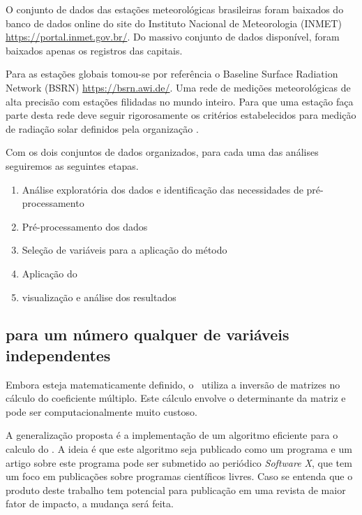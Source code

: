 
O conjunto de dados das estações meteorológicas brasileiras foram baixados do banco de dados online do site do Instituto Nacional de Meteorologia (INMET) \url{https://portal.inmet.gov.br/}. Do massivo conjunto de dados disponível, foram baixados apenas os registros das capitais.

Para as estações globais tomou-se por referência o Baseline Surface Radiation Network (BSRN) \url{https://bsrn.awi.de/}. Uma rede de medições meteorológicas de alta precisão com estações filidadas no mundo inteiro. Para que uma estação faça parte desta rede deve seguir rigorosamente os critérios estabelecidos para medição de radiação solar definidos pela organização \cite{Salazar2020}.

Com os dois conjuntos de dados organizados, para cada uma das análises seguiremos as seguintes etapas.

\begin{enumerate}
    \item Análise exploratória dos dados e identificação das necessidades de pré-processamento
    \item Pré-processamento dos dados
    \item Seleção de variáveis para a aplicação do método
    \item Aplicação do \dmc
    \item visualização e análise dos resultados
\end{enumerate}



\subsection{\dmc para um número qualquer de variáveis independentes}

Embora esteja matematicamente definido, o \dmc~utiliza a inversão de matrizes no cálculo do coeficiente múltiplo. Este cálculo envolve o determinante da matriz e pode ser computacionalmente muito custoso.

A generalização proposta é a implementação de um algoritmo eficiente para o calculo do \dmc. A ideia é que este algoritmo seja publicado como um programa e um artigo sobre este programa pode ser submetido ao periódico \emph{Software X}, que tem um foco em publicações sobre programas científicos livres. Caso se entenda que o produto deste trabalho tem potencial para publicação em uma revista de maior fator de impacto, a mudança será feita.

